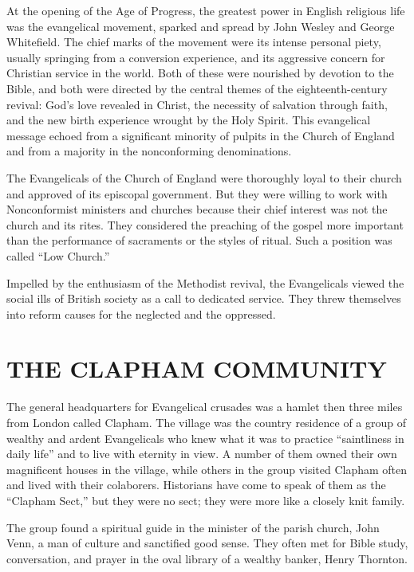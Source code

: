 At the opening of the Age of Progress, the greatest power in English religious life was the
evangelical movement, sparked and spread by John Wesley and George Whitefield. The chief marks of
the movement were its intense personal piety, usually springing from a conversion experience, and
its aggressive concern for Christian service in the world. Both of these were nourished by devotion
to the Bible, and both were directed by the central themes of the eighteenth-century revival: God’s
love revealed in Christ, the necessity of salvation through faith, and the new birth experience
wrought by the Holy Spirit. This evangelical message echoed from a significant minority of pulpits
in the Church of England and from a majority in the nonconforming denominations.

The Evangelicals of the Church of England were thoroughly loyal to their church and approved of its
episcopal government. But they were willing to work with Nonconformist ministers and churches
because their chief interest was not the church and its rites. They considered the preaching of the
gospel more important than the performance of sacraments or the styles of ritual. Such a position
was called “Low Church.”

Impelled by the enthusiasm of the Methodist revival, the Evangelicals viewed the social ills of
British society as a call to dedicated service. They threw themselves into reform causes for the
neglected and the oppressed.

\section{THE CLAPHAM COMMUNITY}

The general headquarters for Evangelical crusades was a hamlet then three miles from London called
Clapham. The village was the country residence of a group of wealthy and ardent Evangelicals who
knew what it was to practice “saintliness in daily life” and to live with eternity in view. A number
of them owned their own magnificent houses in the village, while others in the group visited Clapham
often and lived with their colaborers. Historians have come to speak of them as the “Clapham Sect,”
but they were no sect; they were more like a closely knit family.

The group found a spiritual guide in the minister of the parish church, John Venn, a man of culture
and sanctified good sense. They often met for Bible study, conversation, and prayer in the oval
library of a wealthy banker, Henry Thornton.

